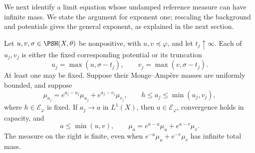 We next identify a limit equation whose undamped reference measure can have infinite mass. We state the argument for exponent one; rescaling the background and potentials gives the general exponent, as explained in the next section.

\begin{lemma}\label{lem:big-truncated-addition-limit}
Let $u,v,\sigma\in\PSH(X,\theta)$ be nonpositive, with $u,v\preceq\varphi$, and let $t_j\uparrow\infty$. Each of $u_j,v_j$ is either the fixed corresponding potential or its truncation
\[
 u_j=\max(u,\sigma-t_j),\qquad
 v_j=\max(v,\sigma-t_j).
\]
At least one may be fixed. Suppose their Monge--Amp\`ere masses are uniformly bounded, and suppose
\[
 \mu_{a_j}=e^{a_j-u_j}\mu_{u_j}+e^{a_j-v_j}\mu_{v_j},
 \qquad h\leq a_j\leq\min(u_j,v_j),
\]
where $h\in\mathcal E_\varphi$ is fixed. If $a_j\to a$ in $L^1(X)$, then $a\in\mathcal E_\varphi$, convergence holds in capacity, and
\[
 a\leq\min(u,v),\qquad
 \mu_a=e^{a-u}\mu_u+e^{a-v}\mu_v.
\]
The measure on the right is finite, even when $e^{-u}\mu_u+e^{-v}\mu_v$ has infinite total mass.
\end{lemma}
